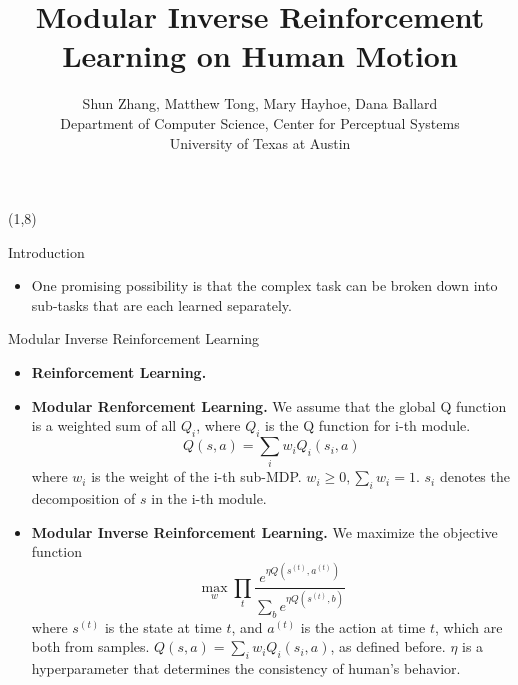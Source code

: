 \documentclass[final]{beamer}
\title{Modular Inverse Reinforcement Learning on Human Motion}
\author{Shun Zhang, Matthew Tong, Mary Hayhoe, Dana Ballard\\
Department of Computer Science, Center for Perceptual Systems\\
University of Texas at Austin}
\begin{document}
\begin{frame}{} 

\begin{textblock}{37}(1,8)
\begin{block}{Introduction}
\begin{itemize}
\item
One promising possibility is that the complex task can be broken down into 
sub-tasks that are each learned separately.
\end{itemize}
\end{block}

\begin{block}{Modular Inverse Reinforcement Learning}
\begin{itemize}
\item {\bf Reinforcement Learning.}
\item {\bf Modular Renforcement Learning.}
We assume that the global Q function is a weighted
sum of all $Q_i$, where $Q_i$ is the Q function for i-th module.
$$Q(s, a) = \sum_i w_i Q_i (s_i, a)$$
where $w_i$ is the weight of the i-th sub-MDP. $w_i \geq 0, \sum_i w_i = 1$.
$s_i$ denotes the decomposition of $s$ in the i-th module.
\item {\bf Modular Inverse Reinforcement Learning.}
We maximize the objective function
$$\max_w \prod_t \frac{e^{\eta Q(s^{(t)}, a^{(t)})}}{\sum_b e^{\eta Q(s^{(t)},
b)}}$$
where $s^{(t)}$ is the state at time $t$, and $a^{(t)}$ is the action at time
$t$, which are both from samples. $Q(s, a) = \sum_i w_i Q_i(s_i, a)$, as defined
before. $\eta$ is a hyperparameter that determines the consistency of human's
behavior.
\end{itemize}
\end{block}
\end{textblock}


\end{frame}
\end{document}
